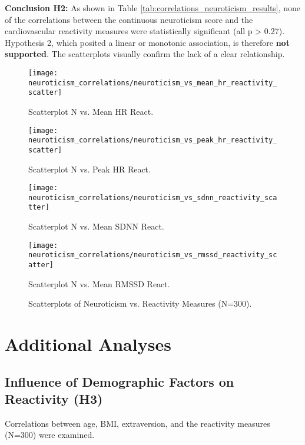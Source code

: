\documentclass[11pt, a4paper]{report}
\begin{document}
\textbf{Conclusion H2:} As shown in Table \ref{tab:correlations_neuroticism_results}, none of the correlations between the continuous neuroticism score and the cardiovascular reactivity measures were statistically significant (all p > 0.27). Hypothesis 2, which posited a linear or monotonic association, is therefore \textbf{not supported}. The scatterplots visually confirm the lack of a clear relationship.

\begin{figure}[H]
    \centering
    \begin{minipage}{0.48\textwidth}
        \texttt{[image: neuroticism\_correlations/neuroticism\_vs\_mean\_hr\_reactivity\_scatter]}
        \caption{Scatterplot N vs. Mean HR React.}
        \label{fig:scatter_h2_start_results}
    \end{minipage}\hfill
    \begin{minipage}{0.48\textwidth}
        \texttt{[image: neuroticism\_correlations/neuroticism\_vs\_peak\_hr\_reactivity\_scatter]}
        \caption{Scatterplot N vs. Peak HR React.}
    \end{minipage}
    \vspace{\floatsep}
    \begin{minipage}{0.48\textwidth}
        \texttt{[image: neuroticism\_correlations/neuroticism\_vs\_sdnn\_reactivity\_scatter]}
        \caption{Scatterplot N vs. Mean SDNN React.}
    \end{minipage}\hfill
     \begin{minipage}{0.48\textwidth}
        \texttt{[image: neuroticism\_correlations/neuroticism\_vs\_rmssd\_reactivity\_scatter]}
        \caption{Scatterplot N vs. Mean RMSSD React.}
        \label{fig:scatter_h2_end_results}
    \end{minipage}
    \caption{Scatterplots of Neuroticism vs. Reactivity Measures (N=300).}
\end{figure}


\section{Additional Analyses}
\label{sec:results_additional} %

\subsection{Influence of Demographic Factors on Reactivity (H3)}
\label{subsec:results_h3_demographics_add} %
Correlations between age, BMI, extraversion, and the reactivity measures (N=300) were examined.
\end{document}
